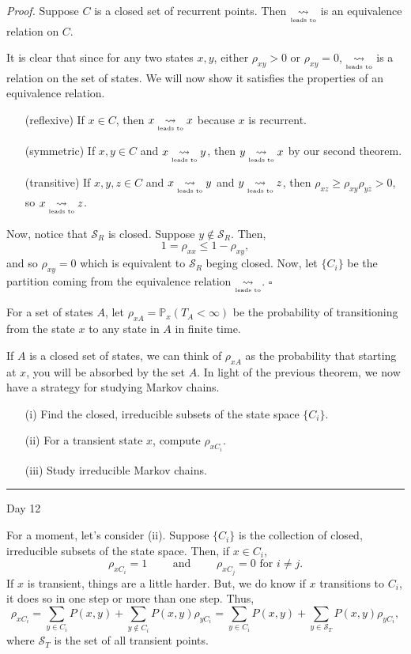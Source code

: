\documentclass{problemset}
\newcommand{\1}{\mathbf{1}}
\renewcommand{\P}{\mathbb{P}}
\newcommand{\ldsto}{\underset{\text{\tiny leads to}}{\leadsto}}
\newcommand{\fatrule}[1]{\vspace{.3cm}\hrule {\hfill \sf #1}\par}
\newenvironment{proof}{\emph{Proof.}}{\hfill$\square$}
\begin{document}
	\begin{proof}
		Suppose $C$ is a closed set of recurrent points. Then $\ldsto$ is an equivalence
		relation on $C$.

		It is clear that since for any two states $x,y$, either $\rho_{xy}>0$ or $\rho_{xy}=0$,
		$\ldsto$ is a relation on the set of states.  We will now show it satisfies the properties
		of an equivalence relation.

		\begin{enumerate}
			\item[(reflexive)] If $x\in C$, then $x\ldsto x$ because $x$ is recurrent.
			\item[(symmetric)] If $x,y\in C$ and $x\ldsto y$, then $y\ldsto x$ by our second theorem.
			\item[(transitive)] If $x,y,z\in C$ and $x\ldsto y$ and $y\ldsto z$, then
				$\rho_{xz} \geq \rho_{xy}\rho_{yz} > 0$, so $x\ldsto z$.
		\end{enumerate}

		Now, notice that $\mathcal S_R$ is closed.  Suppose $y\notin \mathcal S_R$.  Then,
		\[
			1=\rho_{xx} \leq 1-\rho_{xy},
		\]
		and so $\rho_{xy}=0$ which is equivalent to $\mathcal S_R$ beging closed.  Now,
		let $\{C_i\}$ be the partition coming from the equivalence relation $\ldsto$.
	\end{proof}

	\begin{definition}
		For a set of states $A$, let $\rho_{xA}=\P_x(T_A<\infty)$ be the probability of transitioning
		from the state $x$ to any state in $A$ in finite time.
	\end{definition}

	If $A$ is a closed set of states, we can think of $\rho_{xA}$ as the probability that starting
	at $x$, you will be absorbed by the set $A$.  In light of the previous
	theorem, we now have a strategy for studying Markov chains.
	\begin{enumerate}
		\item[(i)] Find the closed, irreducible subsets of the state space $\{C_i\}$.
		\item[(ii)] For a transient state $x$, compute $\rho_{xC_i}$.
		\item[(iii)] Study irreducible Markov chains.
	\end{enumerate}

	\fatrule{Day 12}
	For a moment, let's consider (ii).  Suppose $\{C_i\}$ is the collection of closed, irreducible subsets
	of the state space.  Then, if $x\in C_i$,
	\[
		\rho_{xC_i} = 1\qquad\text{ and }\qquad \rho_{xC_j} = 0\text{ for $i\neq j$}.
	\]
	If $x$ is transient, things are a little harder.  But, we do know if $x$ transitions 
	to $C_i$, it does so in one step or more than one step.  Thus,
	\begin{equation}
		\label{EqRhoC}
		\rho_{xC_i} = \sum_{y\in C_i} P(x,y) + \sum_{y\notin C_i} P(x,y)\rho_{yC_i}
		= \sum_{y\in C_i} P(x,y) + \sum_{y\in \mathcal S_T} P(x,y)\rho_{yC_i},
	\end{equation}
	where $\mathcal S_T$ is the set of all transient points.
\end{document}
